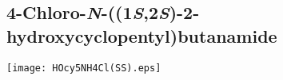 %
%

\subsection{4\hyp{}Chloro\hyp{}\textit{N}\hyp{}((1\textit{S},2\textit{S})\hyp{}2\hyp{}hydroxycyclopentyl)butanamide }


\begin{scheme}[H]
	\begin{center}
		\texttt{[image: HOcy5NH4Cl(SS).eps]}
	\end{center}
\end{scheme}

